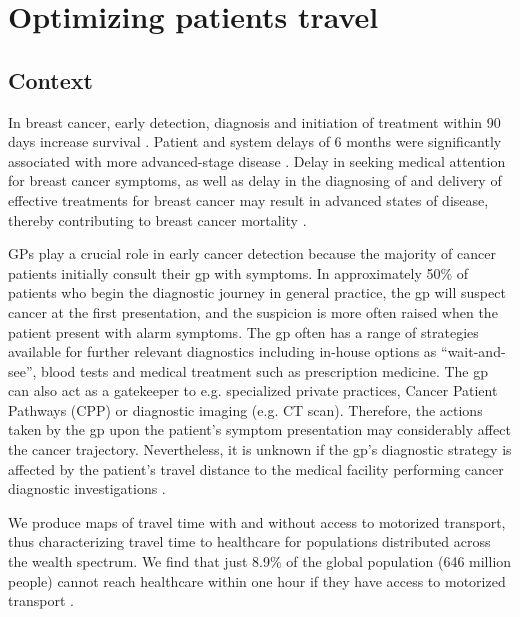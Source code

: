 \chapter{Optimizing patients travel}

\section{Context}


In breast cancer, early detection, diagnosis and initiation of treatment within 90 days increase survival \cite{williams_assessment_2015}.
Patient and system delays of 6 months were significantly associated with more advanced-stage disease \cite{pace_delays_2015}.
Delay in seeking medical attention for breast cancer symptoms, as well as delay in the diagnosing of and delivery of effective treatments for breast cancer may result in advanced states of disease, thereby contributing to breast cancer mortality \cite{caplan_delay_1992}.

GPs play a crucial role in early cancer detection because the majority of cancer patients initially consult their \ac{gp} with symptoms. In approximately 50\% of patients who begin the diagnostic journey in general practice, the \ac{gp} will suspect cancer at the first presentation, and the suspicion is more often raised when the patient present with alarm symptoms. The \ac{gp} often has a range of strategies available for further relevant diagnostics including in-house options as ``wait-and-see'', blood tests and medical treatment such as prescription medicine. The \ac{gp} can also act as a gatekeeper to e.g. specialized private practices, Cancer Patient Pathways (CPP) or diagnostic imaging (e.g. CT scan). Therefore, the actions taken by the \ac{gp} upon the patient's symptom presentation may considerably affect the cancer trajectory. Nevertheless, it is unknown if the \ac{gp}'s diagnostic strategy is affected by the patient's travel distance to the medical facility performing cancer diagnostic investigations \cite{flytkjaer_virgilsen_cancer_2019}.

We produce maps of travel time with and without access to motorized transport, thus characterizing travel time to healthcare for populations distributed across the wealth spectrum. We find that just 8.9\% of the global population (646 million people) cannot reach healthcare within one hour if they have access to motorized transport \cite{weiss_global_2020}.

